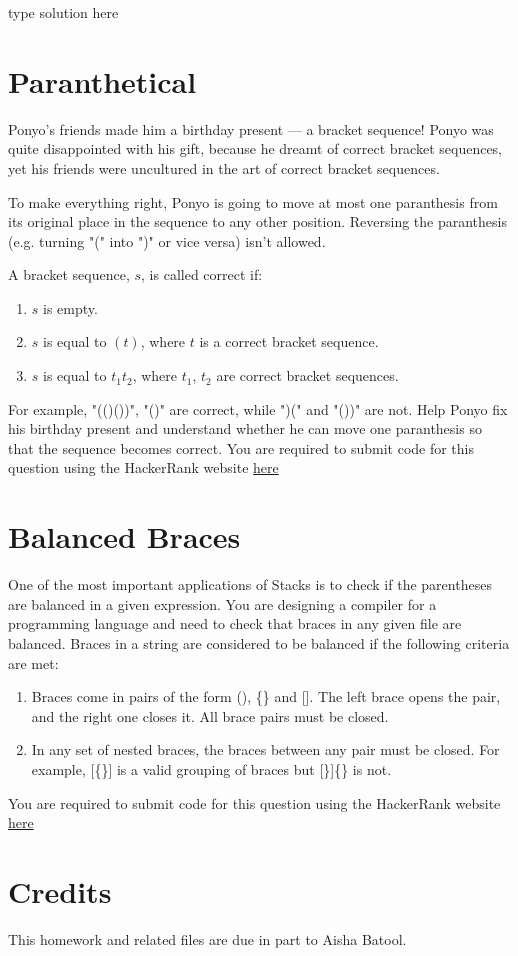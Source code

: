 \documentclass[addpoints]{exam}
\begin{document}
	\begin{mdframed}
		type solution here
	\end{mdframed}
	
	\section{Paranthetical}
	Ponyo's friends made him a birthday present — a bracket sequence! Ponyo was quite disappointed with his gift, because he dreamt of correct bracket sequences, yet his friends were uncultured in the art of correct bracket sequences.
	
	To make everything right, Ponyo is going to move at most one paranthesis from its original place in the sequence to any other position. Reversing the paranthesis (e.g. turning "(" into ")" or vice versa) isn't allowed.
	
	A bracket sequence, $s$, is called correct if:
	
	\begin{enumerate}
		\item $s$ is empty.
		\item $s$ is equal to $(t)$, where $t$ is a correct bracket sequence.
		\item $s$ is equal to $t_1t_2$, where $t_1$, $t_2$ are correct bracket sequences.
	\end{enumerate}
	
	For example, "(()())", "()" are correct, while ")(" and "())" are not. Help Ponyo fix his birthday present and understand whether he can move one paranthesis so that the sequence becomes correct. You are required to submit code for this question using the HackerRank website \href{https://hr.gs/hw1_cs102}{here}
	
	\section{Balanced Braces}
	One of the most important applications of Stacks is to check if the parentheses are balanced in a given expression. You are designing a compiler for a programming language and need to check that braces in any given file are balanced. Braces in a string are considered to be balanced if the following criteria are met:
	\begin{enumerate}
		\item Braces come in pairs of the form (), \{\} and [].  The left brace opens the pair, and the right one closes it. All brace pairs must be closed.
		
		\item In any set of nested braces, the braces between any pair must be closed. For example, [\{\}] is a valid grouping of braces but [\}]\{\} is not.
		
	\end{enumerate}
	
	You are required to submit code for this question using the HackerRank website \href{https://hr.gs/hw1_cs102}{here}
	
	\section*{Credits}
	
	This homework and related files are due in part to Aisha Batool.
	
\end{document}
